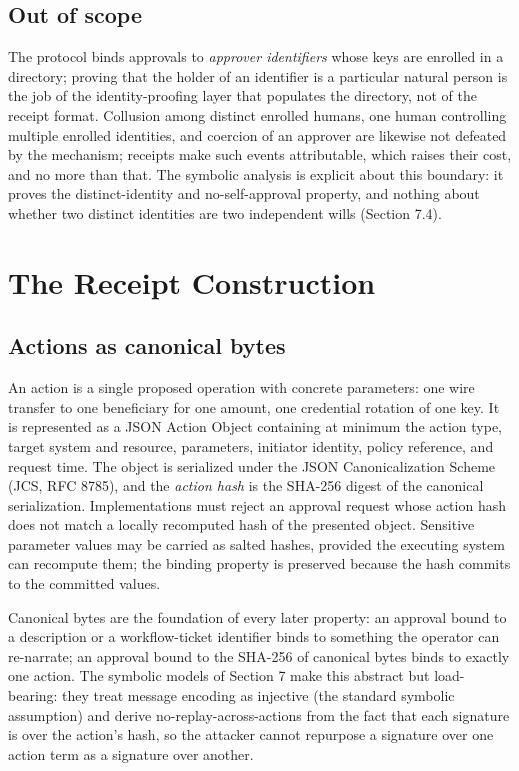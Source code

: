 \documentclass[11pt]{article}
\begin{document}
\subsection{Out of scope}

The protocol binds approvals to \emph{approver identifiers} whose keys are
enrolled in a directory; proving that the holder of an identifier is a particular
natural person is the job of the identity-proofing layer that populates the
directory, not of the receipt format. Collusion among distinct enrolled humans,
one human controlling multiple enrolled identities, and coercion of an approver
are likewise not defeated by the mechanism; receipts make such events
attributable, which raises their cost, and no more than that. The symbolic
analysis is explicit about this boundary: it proves the distinct-identity and
no-self-approval property, and nothing about whether two distinct identities are
two independent wills (Section 7.4).

\section{The Receipt Construction}

\subsection{Actions as canonical bytes}

An action is a single proposed operation with concrete parameters: one wire
transfer to one beneficiary for one amount, one credential rotation of one key. It
is represented as a JSON Action Object containing at minimum the action type,
target system and resource, parameters, initiator identity, policy reference, and
request time. The object is serialized under the JSON Canonicalization Scheme
(JCS, RFC 8785), and the \emph{action hash} is the SHA-256 digest of the canonical
serialization. Implementations must reject an approval request whose action hash
does not match a locally recomputed hash of the presented object. Sensitive
parameter values may be carried as salted hashes, provided the executing system
can recompute them; the binding property is preserved because the hash commits to
the committed values.

Canonical bytes are the foundation of every later property: an approval bound to a
description or a workflow-ticket identifier binds to something the operator can
re-narrate; an approval bound to the SHA-256 of canonical bytes binds to exactly
one action. The symbolic models of Section 7 make this abstract but load-bearing:
they treat message encoding as injective (the standard symbolic assumption) and
derive no-replay-across-actions from the fact that each signature is over the
action's hash, so the attacker cannot repurpose a signature over one action term
as a signature over another.
\end{document}
